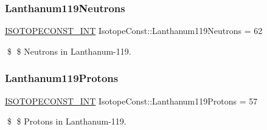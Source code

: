 \subsubsection{\texorpdfstring{Lanthanum119\+Neutrons}{Lanthanum119Neutrons}}
{\footnotesize\ttfamily \mbox{\hyperlink{group___isotope_const-_macros_ga5f18360b3e99483a35c32d789e62621c}{I\+S\+O\+T\+O\+P\+E\+C\+O\+N\+S\+T\+\_\+\+I\+NT}} Isotope\+Const\+::\+Lanthanum119\+Neutrons = 62}

\$ \$ Neutrons in Lanthanum-\/119. \mbox{\label{group___isotope_const-_lanthanum-_la119_gaa363337328ad2b87844b814d68e13a97}} 
\subsubsection{\texorpdfstring{Lanthanum119\+Protons}{Lanthanum119Protons}}
{\footnotesize\ttfamily \mbox{\hyperlink{group___isotope_const-_macros_ga5f18360b3e99483a35c32d789e62621c}{I\+S\+O\+T\+O\+P\+E\+C\+O\+N\+S\+T\+\_\+\+I\+NT}} Isotope\+Const\+::\+Lanthanum119\+Protons = 57}

\$ \$ Protons in Lanthanum-\/119. 